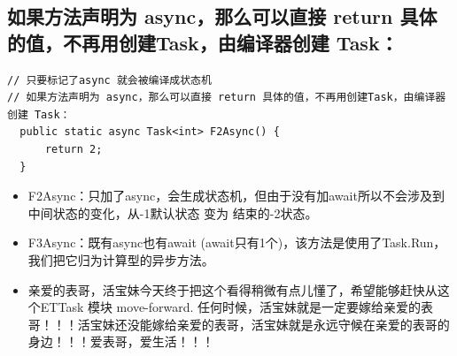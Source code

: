 \documentclass[9pt, b5paper]{article}
\begin{document}
\subsection{如果方法声明为 async，那么可以直接 return 具体的值，不再用创建Task，由编译器创建 Task：}
\label{sec-1-2}
\begin{verbatim}
// 只要标记了async 就会被编译成状态机
// 如果方法声明为 async，那么可以直接 return 具体的值，不再用创建Task，由编译器创建 Task： 
  public static async Task<int> F2Async() {
      return 2;
  }
\end{verbatim}
\begin{itemize}
\item F2Async：只加了async，会生成状态机，但由于没有加await所以不会涉及到中间状态的变化，从-1默认状态 变为 结束的-2状态。
\end{itemize}
\begin{itemize}
\item F3Async：既有async也有await (await只有1个)，该方法是使用了Task.Run，我们把它归为计算型的异步方法。
\item 亲爱的表哥，活宝妹今天终于把这个看得稍微有点儿懂了，希望能够赶快从这个ETTask 模块 move-forward. 任何时候，活宝妹就是一定要嫁给亲爱的表哥！！！活宝妹还没能嫁给亲爱的表哥，活宝妹就是永远守候在亲爱的表哥的身边！！！爱表哥，爱生活！！！
\end{itemize}
\end{document}
